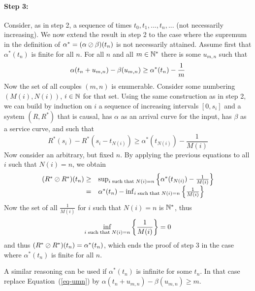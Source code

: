 \paragraph{Step 3: }
Consider, as in step 2, a sequence of times $t_0, t_1, ..., t_n,
...$ (not necessarily increasing). We now extend the result in
step 2 to the case where the supremum in the definition of
$\alpha^*=(\alpha \oslash \beta)(t_n)$ is not necessarily attained.
Assume first that $\alpha^*(t_n)$ is finite for all $n$. For all
$n$ and all $m \in \mathbb{N}^*$ there is some $u_{m,n}$ such that
\begin{equation}\mylabel{eq-umn}
  \alpha(t_n + u_{m,n}) - \beta(u_{m,n}) \geq \alpha^*(t_n) -
 \frac{1}{m}
\end{equation}
Now the set of all couples $(m,n)$ is enumerable. Consider some
numbering $(M(i), N(i))$, $i \in \mathbb{N}$ for that set. Using the
same construction as in step 2, we can build by induction on $i$ a
sequence of increasing intervals $[0, s_i]$ and a system $(R,R^*)$
that is causal, has $\alpha$ as an arrival curve for the input,
has $\beta$ as a service curve, and such that
 $$
 R^*(s_i)- R^*(s_i- t_{N(i)}) \geq \alpha^*(t_{N(i)})- \frac{1}{M(i)}
 $$
Now consider an arbitrary, but fixed $n$. By applying the previous
equations to all $i$ such that $N(i)=n$, we obtain
$$
  \begin{array}{rl}
    (R^* \oslash R^*)(t_n)
     \geq & \sup_{i \mathrm{\; such \; that \; } N(i)=n} \left\{
    \alpha^*(t_{N(i)}) - \frac{1}{M(i)}\right\}\\
    =  & \alpha^*(t_n) - \inf_{i \mathrm{\; such \; that \; } N(i)=n}
  \left\{\frac{1}{M(i)}\right\}
  \end{array}
 $$
Now the set of all $\frac{1}{M(i)}$ for $i$ such that $N(i)=n$ is
$\mathbb{N}^*$, thus
 $$\inf_{i \mathrm{\; such \; that \; } N(i)=n}\left\{\frac{1}{M(i)}\right\}=0$$
and thus $(R^* \oslash R^*)(t_n)= \alpha^*(t_n)$, which ends the
proof of step 3 in the case where $\alpha^*(t_n)$ is finite for
all $n$.

A similar reasoning can be used if $\alpha^*(t_n)$ is infinite for
some $t_n$. In that case replace Equation~(\ref{eq-umn}) by
$\alpha(t_n + u_{m,n}) - \beta(u_{m,n}) \geq m $.

